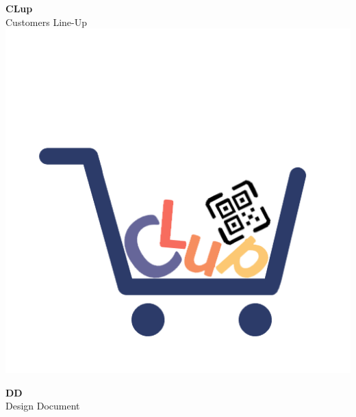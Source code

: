



\begin{titlepage}
  \begin{center}

    \HUGE \textbf{CLup} \\[0.5cm]
    \LARGE Customers Line-Up \\[0.5cm]
    \hspace*{-1.2cm}\includegraphics[scale=0.5]{../logo/clup_logo_nobg.png}

    \vfill

    \Huge \textbf{DD} \\
    \LARGE Design Document \\[2cm]


\end{center}
\end{titlepage}
